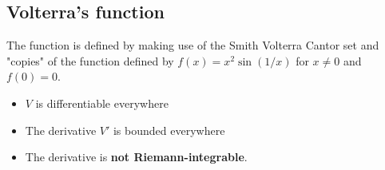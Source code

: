 \documentclass[11pt]{article}
\def\bm#1{\textbf{#1}}
\begin{document}
\subsection{Volterra's function}
The function is defined by making use of the Smith Volterra Cantor set and "copies" of the function defined by $f(x)=x^{2}\sin(1/x)$ for $x\neq 0$ and $f(0)=0$.

\begin{itemize}
	\item $V$ is differentiable everywhere
	\item The derivative $V'$ is bounded everywhere
	\item The derivative is \bm{not Riemann-integrable}.
\end{itemize}
\end{document}
